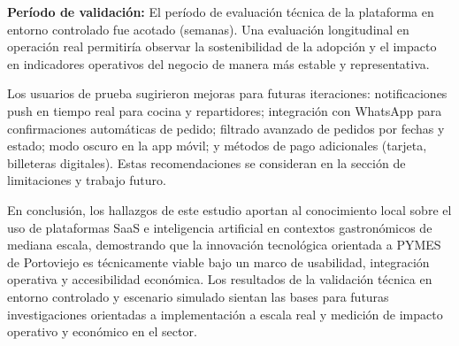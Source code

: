 \textbf{Período de validación:} El período de evaluación técnica de la plataforma en entorno controlado fue acotado (semanas). Una evaluación longitudinal en operación real permitiría observar la sostenibilidad de la adopción y el impacto en indicadores operativos del negocio de manera más estable y representativa.

Los usuarios de prueba sugirieron mejoras para futuras iteraciones: notificaciones push en tiempo real para cocina y repartidores; integración con WhatsApp para confirmaciones automáticas de pedido; filtrado avanzado de pedidos por fechas y estado; modo oscuro en la app móvil; y métodos de pago adicionales (tarjeta, billeteras digitales). Estas recomendaciones se consideran en la sección de limitaciones y trabajo futuro.

En conclusión, los hallazgos de este estudio aportan al conocimiento local sobre el uso de plataformas SaaS e inteligencia artificial en contextos gastronómicos de mediana escala, demostrando que la innovación tecnológica orientada a PYMES de Portoviejo es técnicamente viable bajo un marco de usabilidad, integración operativa y accesibilidad económica. Los resultados de la validación técnica en entorno controlado y escenario simulado sientan las bases para futuras investigaciones orientadas a implementación a escala real y medición de impacto operativo y económico en el sector.
